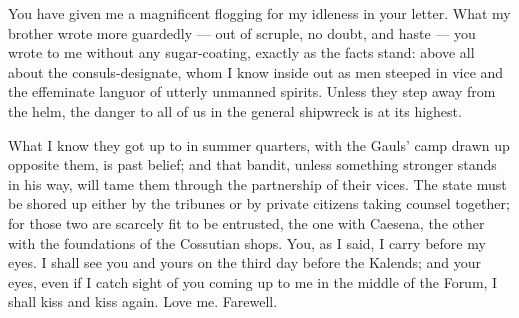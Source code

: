 

 You have given me a magnificent flogging for my idleness in your letter. What my brother wrote more guardedly --- out of scruple, no doubt, and haste --- you wrote to me without any sugar-coating, exactly as the facts stand: above all about the consuls-designate, whom I know inside out as men steeped in vice and the effeminate languor of utterly unmanned spirits. Unless they step away from the helm, the danger to all of us in the general shipwreck is at its highest.

 What I know they got up to in summer quarters, with the Gauls' camp drawn up opposite them, is past belief; and that bandit, unless something stronger stands in his way, will tame them through the partnership of their vices. The state must be shored up either by the tribunes or by private citizens taking counsel together; for those two are scarcely fit to be entrusted, the one with Caesena, the other with the foundations of the Cossutian shops. You, as I said, I carry before my eyes. I shall see you and yours on the third day before the Kalends; and your eyes, even if I catch sight of you coming up to me in the middle of the Forum, I shall kiss and kiss again. Love me. Farewell.
